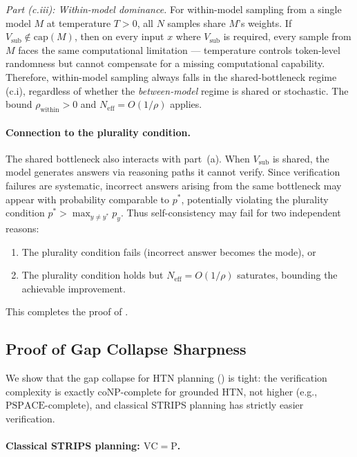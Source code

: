 \documentclass{article}
\theoremstyle{definition}
\theoremstyle{remark}
\newcommand{\PTIME}{\mathrm{P}}
\newcommand{\coNP}{\mathrm{coNP}}
\newcommand{\PSPACE}{\mathrm{PSPACE}}
\newcommand{\VC}{\mathrm{VC}}           %
\begin{document}
\emph{Part (c.iii): Within-model dominance.}
For within-model sampling from a single model $M$ at temperature $T > 0$, all $N$ samples share $M$'s weights.
If $V_{\mathrm{sub}} \notin \mathrm{cap}(M)$, then on every input $x$ where $V_{\mathrm{sub}}$ is required, every sample from $M$ faces the same computational limitation --- temperature controls token-level randomness but cannot compensate for a missing computational capability.
Therefore, within-model sampling always falls in the shared-bottleneck regime (c.i), regardless of whether the \emph{between-model} regime is shared or stochastic.
The bound $\rho_{\mathrm{within}} > 0$ and $N_{\mathrm{eff}} = O(1/\rho)$ applies.

\paragraph{Connection to the plurality condition.}
The shared bottleneck also interacts with part~(a). When $V_{\mathrm{sub}}$ is shared, the model generates answers via reasoning paths it cannot verify. Since verification failures are systematic, incorrect answers arising from the same bottleneck may appear with probability comparable to $p^*$, potentially violating the plurality condition $p^* > \max_{y \neq y^*} p_y$. Thus self-consistency may fail for two independent reasons:
\begin{enumerate}[label=(\roman*)]
    \item The plurality condition fails (incorrect answer becomes the mode), or
    \item The plurality condition holds but $N_{\mathrm{eff}} = O(1/\rho)$ saturates, bounding the achievable improvement.
\end{enumerate}

This completes the proof of .

\subsection{Proof of Gap Collapse Sharpness}

We show that the gap collapse for HTN planning () is tight: the verification complexity is exactly $\coNP$-complete for grounded HTN, not higher (e.g., $\PSPACE$-complete), and classical STRIPS planning has strictly easier verification.

\paragraph{Classical STRIPS planning: $\VC = \PTIME$.}
\end{document}
